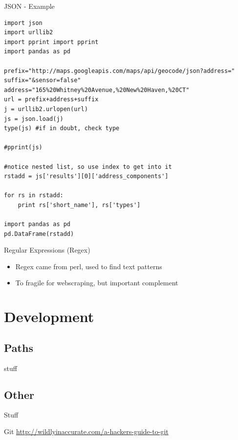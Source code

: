 \documentclass[presentation]{beamer}
\begin{document}
\begin{frame}[fragile,shrink=20,label=sec-5-3-4]{JSON - Example}

 \lstset{numbers=left,language=Python,label= ,caption= }
\begin{lstlisting}
import json
import urllib2
import pprint import pprint
import pandas as pd

prefix="http://maps.googleapis.com/maps/api/geocode/json?address="
suffix="&sensor=false"
address="165%20Whitney%20Avenue,%20New%20Haven,%20CT"
url = prefix+address+suffix
j = urllib2.urlopen(url)
js = json.load(j)
type(js) #if in doubt, check type

#pprint(js) 

#notice nested list, so use index to get into it
rstadd = js['results'][0]['address_components']

for rs in rstadd:
    print rs['short_name'], rs['types']

import pandas as pd
pd.DataFrame(rstadd)
\end{lstlisting}
\end{frame}


\begin{frame}[label=sec-5-3-5]{Regular Expressions (Regex)}
\begin{itemize}
\item Regex came from perl, used to find text patterns
\item To fragile for webscraping, but important complement
\end{itemize}
\end{frame}


\section{Development}
\label{sec-6}

\subsection{Paths}
\label{sec-6-1}

stuff

\subsection{Other}
\label{sec-6-2}

Stuff



\begin{frame}[label=sec-7-0-1]{Git}
\url{http://wildlyinaccurate.com/a-hackers-guide-to-git}
\end{frame}
\end{document}
